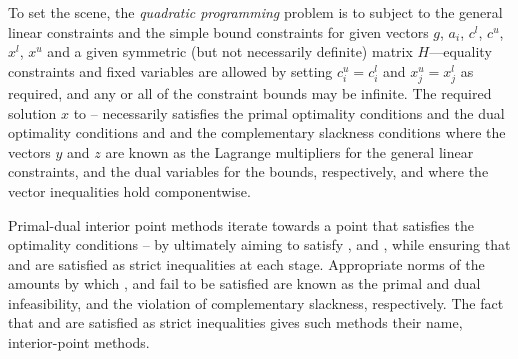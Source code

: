 \documentclass[twoside]{article}
\begin{document}
To set the scene, the {\em quadratic programming} problem is to
subject to the general linear constraints
and the simple bound constraints
for given
vectors $g$, $a_{i}$, $c^{l}$, $c^{u}$, $x^{l}$, $x^{u}$
and a given symmetric (but not necessarily definite) matrix $H$---equality
constraints and fixed variables are allowed by setting
$c_{i}^{u} = c_{i}^{l}$ and $x_{j}^{u} = x_{j}^{l}$ as required,
and any or all of the constraint bounds may be infinite.
The required solution $x$ to -- necessarily satisfies
the primal optimality conditions
and
the dual optimality conditions
and
and the complementary slackness conditions
where the vectors $y$ and $z$ are
known as the Lagrange multipliers for
the general linear constraints, and the dual variables for the bounds,
respectively, and where the vector inequalities hold componentwise.

Primal-dual interior point methods iterate towards a point
that satisfies the optimality conditions --
by ultimately aiming to satisfy
,  and , while ensuring that
 and  are
satisfied as strict inequalities at each stage.
Appropriate norms of the amounts by
which ,  and  fail to be satisfied are known as the
primal and dual infeasibility, and the violation of complementary slackness,
respectively. The fact that  and  are satisfied as strict
inequalities gives such methods their name, interior-point methods.
\end{document}

